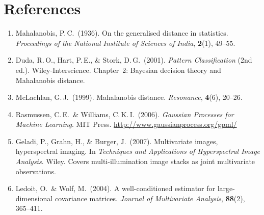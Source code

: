 \documentclass[11pt, a4paper]{article}
\begin{document}
\section*{References}

\begin{enumerate}
  \item Mahalanobis, P.\,C.\ (1936).
    On the generalised distance in statistics.
    \textit{Proceedings of the National Institute of Sciences of India},
    \textbf{2}(1), 49--55.

  \item Duda, R.\,O., Hart, P.\,E., \& Stork, D.\,G.\ (2001).
    \textit{Pattern Classification} (2nd ed.).
    Wiley-Interscience.
    Chapter~2: Bayesian decision theory and Mahalanobis distance.

  \item McLachlan, G.\,J.\ (1999).
    Mahalanobis distance.
    \textit{Resonance}, \textbf{4}(6), 20--26.

  \item Rasmussen, C.\,E.\ \& Williams, C.\,K.\,I.\ (2006).
    \textit{Gaussian Processes for Machine Learning}.
    MIT Press.
    \url{http://www.gaussianprocess.org/gpml/}

  \item Geladi, P., Grahn, H., \& Burger, J.\ (2007).
    Multivariate images, hyperspectral imaging.
    In \textit{Techniques and Applications of Hyperspectral Image
    Analysis}. Wiley.
    Covers multi-illumination image stacks as joint multivariate
    observations.

  \item Ledoit, O.\ \& Wolf, M.\ (2004).
    A well-conditioned estimator for large-dimensional covariance matrices.
    \textit{Journal of Multivariate Analysis}, \textbf{88}(2), 365--411.
\end{enumerate}
\end{document}
